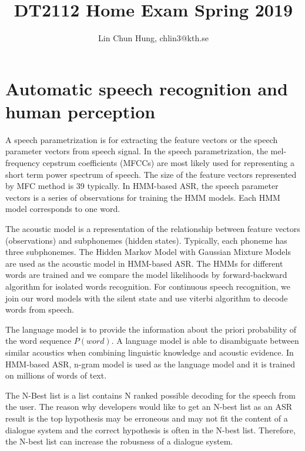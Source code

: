 \documentclass[12pt]{article}
\newenvironment{problem}[2][Problem]{\begin{trivlist}
\item[\hskip \labelsep {\bfseries #1}\hskip \labelsep {\bfseries #2.}]}{\end{trivlist}}
\begin{document}
\title{DT2112 Home Exam Spring 2019}
\author{Lin Chun Hung, chlin3@kth.se}
\maketitle

\section{Automatic speech recognition and human perception}
\begin{problem}{1.1}
    A speech parametrization is for extracting the feature vectors or
    the speech parameter vectors from speech signal. In the speech parametrization,
    the mel-frequency cepstrum coefficients (MFCCs) are most likely used for
    representing a short term power spectrum of speech. The size of the
    feature vectors represented by MFC method is 39 typically.
    In HMM-based ASR, the speech parameter vectors is a series of observations
    for training the HMM models. Each HMM model corresponds to one word.

    The acoustic model is a representation of the relationship between feature
    vectors (observations) and subphonemes (hidden states).
    Typically, each phoneme has three subphonemes. The Hidden Markov Model with
    Gaussian Mixture Models are used as the acoustic model in HMM-based ASR.
    The HMMs for different words are trained and we compare the model likelihoods
    by forward-backward algorithm for isolated words recognition. For continuous
    speech recognition, we join our word models with the silent state and use viterbi
    algorithm to decode words from speech.

    The language model is to provide the information about the priori probability
    of the word sequence $P(word)$. A language model is able to disambiguate between
    similar acoustics when combining linguistic knowledge and acoustic evidence.
    In HMM-based ASR, n-gram model is used as the language model and it is trained
    on millions of words of text.

    The N-Best list is a list contains N ranked possible decoding for the speech
    from the user.
    The reason why developers would like to get an N-best list as an ASR result
    is the top hypothesis may be erroneous and may not fit the content of a
    dialogue system and the correct hypothesis is often in the N-best list.
    Therefore, the N-best list can increase the robusness of a dialogue system.
\end{problem}
\end{document}
